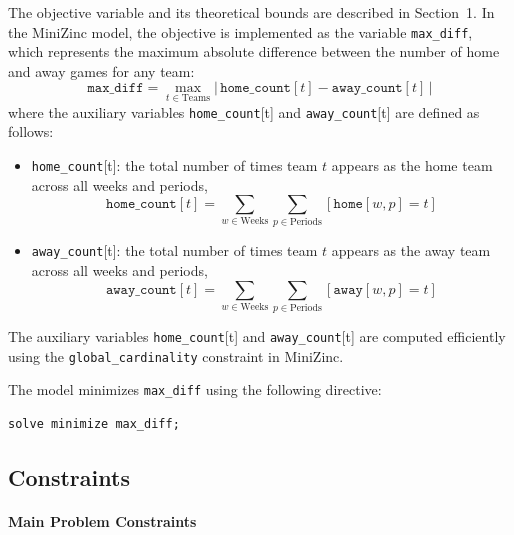 \documentclass[11pt]{article}
\begin{document}
The objective variable and its theoretical bounds are described in Section~1. In the MiniZinc model, the objective is implemented as the variable \texttt{max\_diff}, which represents the maximum absolute difference between the number of home and away games for any team:
\[
\texttt{max\_diff} = \max_{t \in \text{Teams}} \left|\,\texttt{home\_count}[t] - \texttt{away\_count}[t]\,\right|
\]
where the auxiliary variables \texttt{home\_count}[t] and \texttt{away\_count}[t] are defined as follows:
\begin{itemize}
    \item \texttt{home\_count}[t]: the total number of times team $t$ appears as the home team across all weeks and periods,
    \[
    \texttt{home\_count}[t] = \sum_{w \in \text{Weeks}} \sum_{p \in \text{Periods}} [\texttt{home}[w,p] = t]
    \]
    \item \texttt{away\_count}[t]: the total number of times team $t$ appears as the away team across all weeks and periods,
    \[
    \texttt{away\_count}[t] = \sum_{w \in \text{Weeks}} \sum_{p \in \text{Periods}} [\texttt{away}[w,p] = t]
    \]
\end{itemize}

The auxiliary variables \texttt{home\_count}[t] and \texttt{away\_count}[t] are computed efficiently using the \texttt{global\_cardinality} constraint in MiniZinc.

The model minimizes \texttt{max\_diff} using the following directive:
\begin{verbatim}
solve minimize max_diff;
\end{verbatim}

\subsection{Constraints}

\paragraph{Main Problem Constraints}
\end{document}

